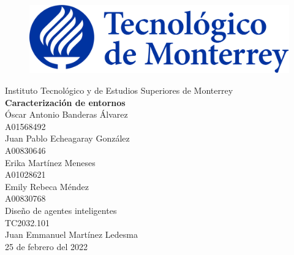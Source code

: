 \documentclass{article}
\begin{document}
    \begin{titlepage}
        \begin{center}
            \begin{figure}
                \centering
                \includegraphics[scale=0.13]{logo_itesm.png}\\ %
            \end{figure}
        \vspace{5cm}
        \LARGE{Instituto Tecnológico y de Estudios Superiores de Monterrey}\\
        \fontsize{12}{14}\selectfont
        \vspace{1cm}
        \textbf{Caracterización de entornos}\\ %
        \vspace{0.7cm}
        Óscar Antonio Banderas Álvarez \\
        \vspace{0.2cm}
        A01568492 \\
        \vspace{0.2cm}
        Juan Pablo Echeagaray González\\ %
        \vspace{0.2cm}
        A00830646 \\ %
        \vspace{0.2cm}
        Erika Martínez Meneses \\
        \vspace{0.2cm}
        A01028621 \\
        \vspace{0.2cm}
        Emily Rebeca Méndez \\
        \vspace{0.2cm}
        A00830768 \\
        \vspace{0.7cm}
        Diseño de agentes inteligentes\\ %
        \vspace{0.2cm}
        TC2032.101\\ %
        \vspace{0.2cm}
        Juan Emmanuel Martínez Ledesma \\ %
        \vspace{0.7cm}
        25 de febrero del 2022\\ %
        \end{center}
    \end{titlepage}
\end{document}
